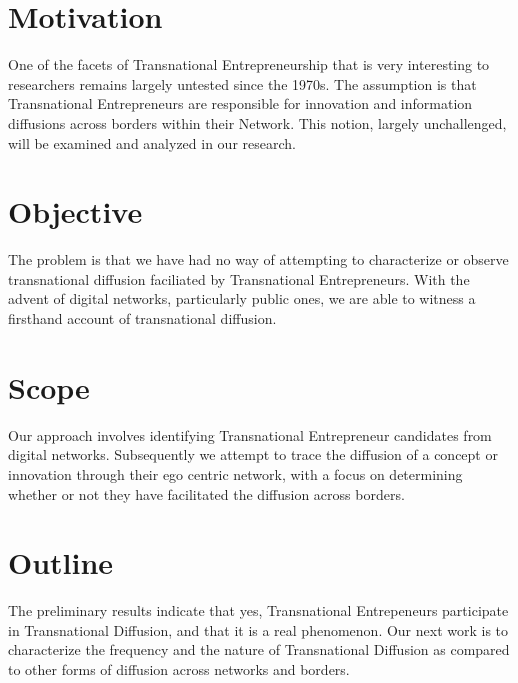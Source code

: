 \section{Motivation}
One of the facets of Transnational Entrepreneurship that is very interesting to researchers remains largely untested since the 1970s. The assumption is that Transnational Entrepreneurs are responsible for innovation and information diffusions across borders within their Network. This notion, largely unchallenged, will be examined and analyzed in our research.

\section{Objective}
The problem is that we have had no way of attempting to characterize or observe transnational diffusion faciliated by Transnational Entrepreneurs. With the advent of digital networks, particularly public ones, we are able to witness a firsthand account of transnational diffusion.

\section{Scope}
Our approach involves identifying Transnational Entrepreneur candidates from digital networks. Subsequently we attempt to trace the diffusion of a concept or innovation through their ego centric network, with a focus on determining whether or not they have facilitated the diffusion across borders.

\section{Outline}
The preliminary results indicate that yes, Transnational Entrepeneurs participate in Transnational Diffusion, and that it is a real phenomenon. Our next work is to characterize the frequency and the nature of Transnational Diffusion as compared to other forms of diffusion across networks and borders. \cite{latexcompanion}
